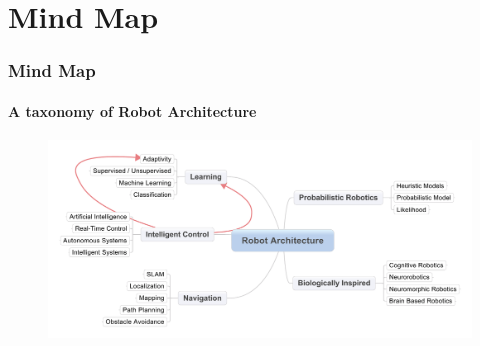 \section{Mind Map}

\begin{frame}
    \frametitle{Mind Map}
    \framesubtitle{A taxonomy of Robot Architecture}

	\begin{figure}[tbp]
  	\centering
  	\includegraphics[width=1\textwidth]{./sections/robot_mindmap.pdf}
	\end{figure}    
    
\end{frame}